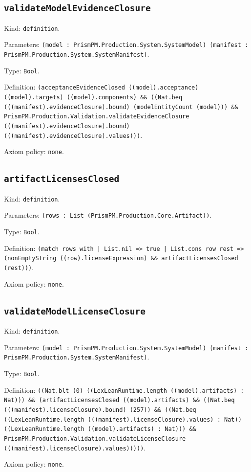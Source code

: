 \documentclass[11pt]{article}
\begin{document}
\subsection*{\texttt{validateModelEvidenceClosure}}
\noindent Kind: \texttt{definition}.\par
\noindent Parameters: \texttt{(model : PrismPM.Production.System.SystemModel) (manifest : PrismPM.Production.System.SystemManifest)}.\par
\noindent Type: \texttt{Bool}.\par
\noindent Definition: \texttt{(acceptanceEvidenceClosed ((model).acceptance) ((model).targets) ((model).components) \&\& ((Nat.beq (((manifest).evidenceClosure).bound) (modelEntityCount (model))) \&\& PrismPM.Production.Validation.validateEvidenceClosure (((manifest).evidenceClosure).bound) (((manifest).evidenceClosure).values)))}.\par
\noindent Axiom policy: \texttt{none}.\par
\subsection*{\texttt{artifactLicensesClosed}}
\noindent Kind: \texttt{definition}.\par
\noindent Parameters: \texttt{(rows : List (PrismPM.Production.Core.Artifact))}.\par
\noindent Type: \texttt{Bool}.\par
\noindent Definition: \texttt{(match rows with | List.nil => true | List.cons row rest => (nonEmptyString ((row).licenseExpression) \&\& artifactLicensesClosed (rest)))}.\par
\noindent Axiom policy: \texttt{none}.\par
\subsection*{\texttt{validateModelLicenseClosure}}
\noindent Kind: \texttt{definition}.\par
\noindent Parameters: \texttt{(model : PrismPM.Production.System.SystemModel) (manifest : PrismPM.Production.System.SystemManifest)}.\par
\noindent Type: \texttt{Bool}.\par
\noindent Definition: \texttt{((Nat.blt (0) ((LexLeanRuntime.length ((model).artifacts) : Nat))) \&\& (artifactLicensesClosed ((model).artifacts) \&\& ((Nat.beq (((manifest).licenseClosure).bound) (257)) \&\& ((Nat.beq ((LexLeanRuntime.length (((manifest).licenseClosure).values) : Nat)) ((LexLeanRuntime.length ((model).artifacts) : Nat))) \&\& PrismPM.Production.Validation.validateLicenseClosure (((manifest).licenseClosure).values)))))}.\par
\noindent Axiom policy: \texttt{none}.\par
\end{document}
